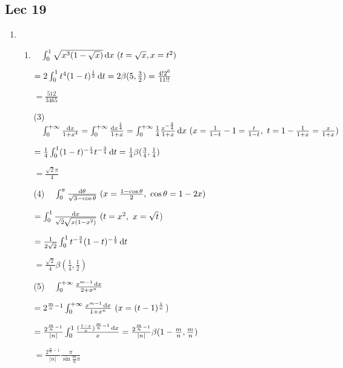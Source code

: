 \subsection{Lec 19}
    \begin{enumerate}[1]
        \item
        \begin{enumerate}[(1)]
        \item
        $\phantom{=} \int_0^1 \sqrt{x^3(1-\sqrt{x})}\dif x\ (t=\sqrt{x},x=t^2)$
        \par $=2\int_0^1 t^4(1-t)^{\frac{1}{2}} \dif t=2\beta(5,\frac{3}{2})=\frac{4!2^6}{11!!}$
        \par $=\frac{512}{3465}$

        \item[(3)]
        $\phantom{=} \int_0^{+\infty} \frac{\dif x}{1+x^4}=\int_0^{+\infty} \frac{\dif x^{\frac{1}{4}}}{1+x}=\int_0^{+\infty} \frac{1}{4}\frac{x^{-\frac{3}{4}}}{1+x}\dif x\ (x=\frac{1}{1-t}-1=\frac{t}{1-t},\ t=1-\frac{1}{1+x}=\frac{x}{1+x})$
        \par $=\frac{1}{4}\int_0^1 (1-t)^{-\frac{1}{4}}t^{-\frac{3}{4}} \dif t=\frac{1}{4}\beta(\frac{3}{4},\frac{1}{4})$
        \par $=\frac{\sqrt{2}\pi}{4}$

        \item[(4)]
        $\phantom{=} \int_0^{\pi} \frac{\dif \theta}{\sqrt{3-\cos \theta}}\ (x=\frac{1-\cos \theta}{2},\ \cos \theta=1-2x)$
        \par $=\int_0^1 \frac{\dif x}{\sqrt{2}\sqrt{x(1-x^2)}}\ (t=x^2,\ x=\sqrt{t}$)
        \par $=\frac{1}{2\sqrt{2}}\int_0^1 t^{-\frac{3}{4}}(1-t)^{-\frac{1}{2}}\dif t$
        \par $=\frac{\sqrt{2}}{4}\beta(\frac{1}{4},\frac{1}{2})$
        
        \item[(5)]
        $\phantom{=} \int_0^{+\infty} \frac{x^{m-1}\dif x}{2+x^n}$
        \par $=2^{\frac{m}{n}-1} \int_0^{+\infty} \frac{x^{m-1}\dif x}{1+x^n}\ (x=(t-1)^{\frac{1}{n}}$)
        \par $=\frac{2^{\frac{m}{n}-1}}{|n|}\int_0^1 \frac{(\frac{1-x}{x})^{\frac{m}{n}-1}\dif x}{x}=\frac{2^{\frac{m}{n}-1}}{|n|}\beta(1-\frac{m}{n},\frac{m}{n})$
        \par $=\frac{2^{\frac{m}{n}-1}}{|n|}\frac{\pi}{ \sin \frac{m}{n}\pi}$
        

\end{enumerate}
\end{enumerate}
